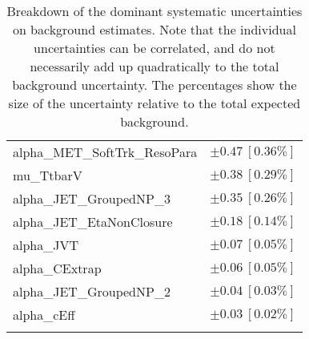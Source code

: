 \begin{table}
\begin{center}
\begin{tabular*}{\textwidth}{@{\extracolsep{\fill}}lc}
alpha\_MET\_SoftTrk\_ResoPara         & $\pm 0.47\ [0.36\%] $       \\
mu\_TtbarV         & $\pm 0.38\ [0.29\%] $       \\
alpha\_JET\_GroupedNP\_3         & $\pm 0.35\ [0.26\%] $       \\
alpha\_JET\_EtaNonClosure         & $\pm 0.18\ [0.14\%] $       \\
alpha\_JVT         & $\pm 0.07\ [0.05\%] $       \\
alpha\_CExtrap         & $\pm 0.06\ [0.05\%] $       \\
alpha\_JET\_GroupedNP\_2         & $\pm 0.04\ [0.03\%] $       \\
alpha\_cEff         & $\pm 0.03\ [0.02\%] $       \\
\noalign{\smallskip}\hline\noalign{\smallskip}
\end{tabular*}
\end{center}
\caption[Breakdown of uncertainty on background estimates]{
Breakdown of the dominant systematic uncertainties on background estimates.
Note that the individual uncertainties can be correlated, and do not necessarily add up quadratically to 
the total background uncertainty. The percentages show the size of the uncertainty relative to the total expected background.
\label{table.results.bkgestimate.uncertainties.VRZAB}}
\end{table}
%